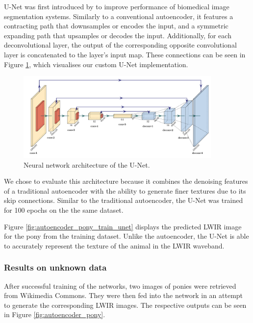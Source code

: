 \documentclass{l4proj}
\begin{document}
U-Net was first introduced by \citet{ronneberger_u-net_2015} to improve performance of biomedical image segmentation systems. Similarly to a conventional autoencoder, it features a contracting path that downsamples or encodes the input, and a symmetric expanding path that upsamples or decodes the input. Additionally, for each deconvolutional layer, the output of the corresponding opposite convolutional layer is concatenated to the layer's input map. These connections can be seen in Figure \ref{fig:unet_architecture}, which visualises our custom U-Net implementation. 

\begin{figure}[ht]
  \centering
  \includegraphics[width=0.9\textwidth]{images/models/unet}
  \caption{Neural network architecture of the U-Net.}
  \label{fig:unet_architecture}
\end{figure}

We chose to evaluate this architecture because it combines the denoising features of a traditional autoencoder with the ability to generate finer textures due to its skip connections. Similar to the traditional autoencoder, the U-Net was trained for 100 epochs on the the same dataset. 

Figure \ref{fig:autoencoder_pony_train_unet} displays the predicted LWIR image for the pony from the training dataset. Unlike the autoencoder, the U-Net is able to accurately represent the texture of the animal in the LWIR waveband.

\subsubsection{Results on unknown data}

After successful training of the networks, two images of ponies were retrieved from Wikimedia Commons. They were then fed into the network in an attempt to generate the corresponding LWIR images. The respective outputs can be seen in Figure \ref{fig:autoencoder_pony}.
\end{document}
